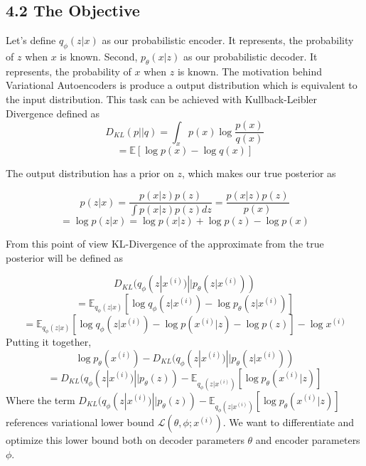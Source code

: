 \documentclass[11pt,twocolumn]{article}
\begin{document}
\subsection{4.2 The Objective}
\hspace*{0.5cm}Let's define $q_\phi(z|x)$ as our probabilistic encoder. It represents, the probability of $z$ when $x$ is known. Second, $p_\theta(x|z)$ as our probabilistic decoder. It represents, the probability of $x$ when $z$ is known. The motivation behind Variational Autoencoders is produce a output distribution which is equivalent to the input distribution. This task can be achieved with Kullback-Leibler Divergence defined as 
$$D_{KL}(p||q) = \int_x p(x) \log \frac{p(x)}{q(x)}$$ 
$$= \mathbb{E}[\log p(x) - \log q(x)]$$

The output distribution has a prior on $z$, which makes our true posterior as 

$$p(z|x) = \frac{p(x|z) p(z)}{\int p(x|z)p(z) dz} = \frac{p(x|z) p(z)}{p(x)}$$
$$ = \log p(z|x) = \log p(x|z) + \log p(z) - \log p(x)$$

From this point of view KL-Divergence of the approximate from the true posterior will be defined as 

$$D_{KL}(q_\phi(z|x^{(i)}) || p_\theta(z|x^{(i)}))$$ 
$$= \mathbb{E}_{q_\phi(z|x)}[\log q_\phi(z|x^{(i)}) - \log p_\theta(z|x^{(i)})]$$
$$ = \mathbb{E}_{q_\phi(z|x)}[\log q_\phi(z|x^{(i)}) - \log p(x^{(i)}|z) - \log p(z)] - \log x^{(i)}$$
Putting it together,
$$\log p_\theta(x^{(i)}) - D_{KL}(q_\phi(z|x^{(i)}) || p_\theta(z|x^{(i)}))$$
$$=D_{KL}(q_\phi(z|x^{(i)}) || p_\theta(z)) - \mathbb{E}_{q_\phi(z|x^{(i)})}[\log p_\theta (x^{(i)}|z)]$$
Where the term $D_{KL}(q_\phi(z|x^{(i)}) || p_\theta(z)) - \mathbb{E}_{q_\phi(z|x^{(i)})}[\log p_\theta (x^{(i)}|z)]$ references variational lower bound $\mathcal{L}(\theta,\phi;x^{(i)})$. We want to differentiate and optimize this lower bound both on decoder parameters $\theta$ and encoder parameters $\phi$.
\end{document}
